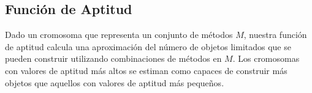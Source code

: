 

\subsection{Función de Aptitud}

Dado un cromosoma que representa un conjunto de métodos $M$,
nuestra función de aptitud calcula una aproximación del número de objetos limitados que se pueden construir utilizando 
combinaciones de métodos en $M$. Los cromosomas con valores de aptitud más altos se estiman 
como capaces de construir más objetos que aquellos con valores de aptitud más pequeños.

